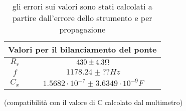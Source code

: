 \documentclass[12pt,]{article}
\begin{document}
\begin{table}[H]
\centering
\begin{subtable}{.5\textwidth}

\begin{tabular}{c|c}
\toprule
\multicolumn{2}{c}{Valori per il bilanciamento del ponte}\\
\midrule
\rowcolor{black!20}$R_r$ & $430 \pm 4.3  \ohm$ \\
$f$ & $ 1178.24\pm ?? Hz $ \\
\rowcolor{black!20}$C_x$ & $1.5682 \cdot 10^{-7} \pm 3.6349 \cdot 10^{-9} F $ \\
\bottomrule
\end{tabular}
\end{subtable}
\caption{gli errori sui valori sono stati calcolati a partire dall'errore dello strumento e per propagazione}
\end{table}

(compatibilità con il valore di C calcolato dal multimetro)
\end{document}
